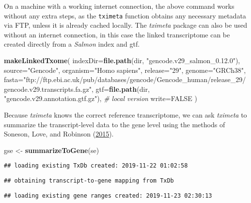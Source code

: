 \documentclass[
]{article}
\newenvironment{Shaded}{}{}
\newcommand{\CommentTok}[1]{\textcolor[rgb]{0.38,0.63,0.69}{\textit{#1}}}
\newcommand{\DataTypeTok}[1]{\textcolor[rgb]{0.56,0.13,0.00}{#1}}
\newcommand{\KeywordTok}[1]{\textcolor[rgb]{0.00,0.44,0.13}{\textbf{#1}}}
\newcommand{\NormalTok}[1]{#1}
\newcommand{\OtherTok}[1]{\textcolor[rgb]{0.00,0.44,0.13}{#1}}
\newcommand{\StringTok}[1]{\textcolor[rgb]{0.25,0.44,0.63}{#1}}
\begin{document}
On a machine with a working internet connection, the above command works
without any extra steps, as the \texttt{tximeta} function obtains any necessary
metadata via FTP, unless it is already cached locally. The \emph{tximeta} package
can also be used without an internet connection, in this case the linked
transcriptome can be created directly from a \emph{Salmon} index and gtf.

\begin{Shaded}
\begin{Highlighting}[]
\KeywordTok{makeLinkedTxome}\NormalTok{(}
  \DataTypeTok{indexDir=}\KeywordTok{file.path}\NormalTok{(dir, }\StringTok{"gencode.v29_salmon_0.12.0"}\NormalTok{),}
  \DataTypeTok{source=}\StringTok{"Gencode"}\NormalTok{,}
  \DataTypeTok{organism=}\StringTok{"Homo sapiens"}\NormalTok{,}
  \DataTypeTok{release=}\StringTok{"29"}\NormalTok{,}
  \DataTypeTok{genome=}\StringTok{"GRCh38"}\NormalTok{,}
  \DataTypeTok{fasta=}\StringTok{"ftp://ftp.ebi.ac.uk/pub/databases/gencode/Gencode_human/release_29/gencode.v29.transcripts.fa.gz"}\NormalTok{,}
  \DataTypeTok{gtf=}\KeywordTok{file.path}\NormalTok{(dir, }\StringTok{"gencode.v29.annotation.gtf.gz"}\NormalTok{), }\CommentTok{# local version}
  \DataTypeTok{write=}\OtherTok{FALSE}
\NormalTok{)}
\end{Highlighting}
\end{Shaded}

Because \emph{tximeta} knows the correct reference transcriptome, we can ask
\emph{tximeta} to summarize the transcript-level data to the gene level using the
methods of Soneson, Love, and Robinson (\protect\hyperlink{ref-Soneson2015}{2015}).

\begin{Shaded}
\begin{Highlighting}[]
\NormalTok{gse <-}\StringTok{ }\KeywordTok{summarizeToGene}\NormalTok{(se)}
\end{Highlighting}
\end{Shaded}

\begin{verbatim}
## loading existing TxDb created: 2019-11-22 01:02:58
\end{verbatim}

\begin{verbatim}
## obtaining transcript-to-gene mapping from TxDb
\end{verbatim}

\begin{verbatim}
## loading existing gene ranges created: 2019-11-23 02:30:13
\end{verbatim}
\end{document}
